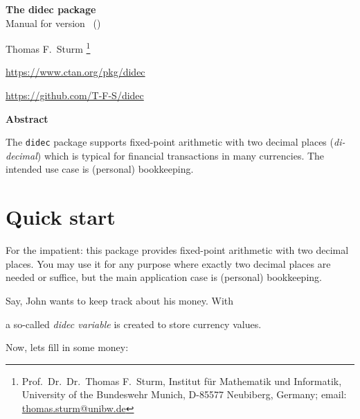 \documentclass[a4paper,11pt]{ltxdoc}
\begin{document}
\begin{center}
\begin{tcolorbox}[enhanced,hbox,tikznode,left=8mm,right=8mm,boxrule=0.4pt,
  colback=white,colframe=Blue_Gray,
  drop lifted shadow=Blue_Gray!50,arc is angular,
  before=\par\vspace*{5mm},after=\par\bigskip]
{\bfseries\LARGE The didec package}\\[3mm]
{\large Manual for version \version\ (\datum)}
\end{tcolorbox}
{\large Thomas F.~Sturm%
  \footnote{Prof.~Dr.~Dr.~Thomas F.~Sturm, Institut f\"{u}r Mathematik und Informatik,
    University of the Bundeswehr Munich, D-85577 Neubiberg, Germany;
     email: \href{mailto:thomas.sturm@unibw.de}{thomas.sturm@unibw.de}}\par\medskip
\normalsize%
\url{https://www.ctan.org/pkg/didec}\par
\url{https://github.com/T-F-S/didec}
}
\end{center}
\bigskip
\begin{absquote}
  \begin{center}\bfseries Abstract\end{center}
  The \texttt{didec} package supports fixed-point arithmetic with two
  decimal places (\emph{di-decimal}) which is typical for financial transactions
  in many currencies. The intended use case is (personal) bookkeeping.
\end{absquote}

\tableofcontents

\clearpage
\section{Quick start}%
For the impatient: this package provides fixed-point arithmetic with
two decimal places. You may use it for any purpose where exactly two decimal
places are needed or suffice, but the main application case is (personal) bookkeeping.

Say, John wants to keep track about his money. With
\begin{dispListing}
\end{dispListing}
a so-called \emph{didec variable} is created to store currency values.

Now, lets fill in some money:
\begin{dispListing}
\end{dispListing}
\end{document}
